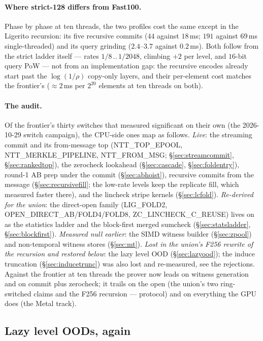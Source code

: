 \documentclass[11pt]{article}
\begin{document}
\paragraph{Where strict-128 differs from Fast100.} Phase by phase at ten
threads, the two profiles cost the same except in the Ligerito recursion:
its five recursive commits ($44$ against $18\,$ms; $191$ against
$69\,$ms single-threaded) and its query grinding ($2.4$--$3.7$ against
$0.2\,$ms). Both follow from the strict ladder itself --- rates
$1/8\,..\,1/2048$, climbing $+2$ per level, and $16$-bit query PoW --- not
from an implementation gap: the recursive encodes already start past the
$\log(1/\rho)$ copy-only layers, and their per-element cost matches the
frontier's ($\approx2\,$ms per $2^{20}$ elements at ten threads on both).

\paragraph{The audit.} Of the frontier's thirty switches that measured
significant on their own (the 2026-10-29 switch campaign), the CPU-side
ones map as follows. \emph{Live}: the streaming commit and its from-message
top (NTT\_TOP\_EPOOL, NTT\_MERKLE\_PIPELINE, NTT\_FROM\_MSG;
\S\ref{sec:streamcommit}, \S\ref{sec:rankedtop}), the zerocheck lookahead
(\S\ref{sec:cascade}, \S\ref{sec:foldentry}), round-1 AB prep under the
commit (\S\ref{sec:abhoist}), recursive commits from the message
(\S\ref{sec:recursivefill}; the low-rate levels keep the replicate fill,
which measured faster there), and the lincheck stripe kernels
(\S\ref{sec:lcfold}). \emph{Re-derived for the union}: the direct-open
family (LIG\_FOLD2, OPEN\_DIRECT\_AB/FOLD4/FOLD8, ZC\_LINCHECK\_C\_REUSE)
lives on as the statistics ladder and the block-first merged sumcheck
(\S\ref{sec:statsladder}, \S\ref{sec:blockfirst}). \emph{Measured null
earlier}: the SIMD witness builder (\S\ref{sec:zpool}) and non-temporal
witness stores (\S\ref{sec:mt}). \emph{Lost in the union's F256 rewrite
of the recursion and restored below}: the lazy level OOD
(\S\ref{sec:lazyood}); the induce truncation (\S\ref{sec:inducetrunc})
was also lost and re-measured, see the rejections. Against the frontier
at ten threads the prover now leads on witness generation and on commit
plus zerocheck; it trails on the open (the union's two ring-switched
claims and the F256 recursion --- protocol) and on everything the GPU
does (the Metal track).

\subsection{Lazy level OODs, again}\label{sec:lazyood2}
\end{document}
